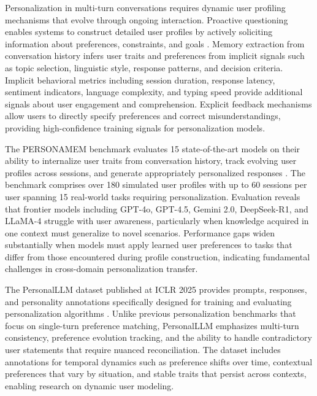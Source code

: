 Personalization in multi-turn conversations requires dynamic user profiling mechanisms that evolve through ongoing interaction. Proactive questioning enables systems to construct detailed user profiles by actively soliciting information about preferences, constraints, and goals \citep{zhang2024knowme}. Memory extraction from conversation history infers user traits and preferences from implicit signals such as topic selection, linguistic style, response patterns, and decision criteria. Implicit behavioral metrics including session duration, response latency, sentiment indicators, language complexity, and typing speed provide additional signals about user engagement and comprehension. Explicit feedback mechanisms allow users to directly specify preferences and correct misunderstandings, providing high-confidence training signals for personalization models.

The PERSONAMEM benchmark evaluates 15 state-of-the-art models on their ability to internalize user traits from conversation history, track evolving user profiles across sessions, and generate appropriately personalized responses \citep{zhang2024knowme}. The benchmark comprises over 180 simulated user profiles with up to 60 sessions per user spanning 15 real-world tasks requiring personalization. Evaluation reveals that frontier models including GPT-4o, GPT-4.5, Gemini 2.0, DeepSeek-R1, and LLaMA-4 struggle with user awareness, particularly when knowledge acquired in one context must generalize to novel scenarios. Performance gaps widen substantially when models must apply learned user preferences to tasks that differ from those encountered during profile construction, indicating fundamental challenges in cross-domain personalization transfer.

The PersonalLLM dataset published at ICLR 2025 provides prompts, responses, and personality annotations specifically designed for training and evaluating personalization algorithms \citep{wang2025personalllm}. Unlike previous personalization benchmarks that focus on single-turn preference matching, PersonalLLM emphasizes multi-turn consistency, preference evolution tracking, and the ability to handle contradictory user statements that require nuanced reconciliation. The dataset includes annotations for temporal dynamics such as preference shifts over time, contextual preferences that vary by situation, and stable traits that persist across contexts, enabling research on dynamic user modeling.

